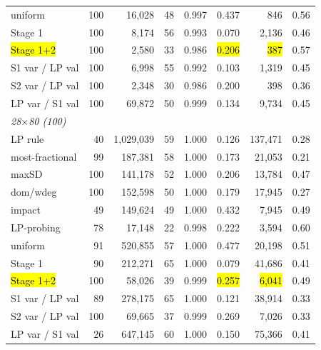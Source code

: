 \begin{table}[t]
\begin{tabular}{lrrrrrrr}
uniform & 100 & 16,028 & 48 & 0.997 & 0.437 & 846 & 0.56 \\
Stage 1 & 100 & 8,174 & 56 & 0.993 & 0.070 & 2,136 & 0.46 \\
\hl{Stage 1+2} & 100 & 2,580 & 33 & 0.986 & \hl{0.206} & \hl{387} & 0.57 \\
S1 var / LP val & 100 & 6,998 & 55 & 0.992 & 0.103 & 1,319 & 0.45 \\
S2 var / LP val & 100 & 2,348 & 30 & 0.986 & 0.200 & 398 & 0.36 \\
LP var / S1 val & 100 & 69,872 & 50 & 0.999 & 0.134 & 9,734 & 0.45 \\
\midrule
\multicolumn{8}{l}{\emph{28$\times$80 (100)}} \\
LP rule & 40 & 1,029,039 & 59 & 1.000 & 0.126 & 137,471 & 0.28 \\
most-fractional & 99 & 187,381 & 58 & 1.000 & 0.173 & 21,053 & 0.21 \\
maxSD & 100 & 141,178 & 52 & 1.000 & 0.206 & 13,784 & 0.47 \\
dom/wdeg & 100 & 152,598 & 50 & 1.000 & 0.179 & 17,945 & 0.27 \\
impact & 49 & 149,624 & 49 & 1.000 & 0.432 & 7,945 & 0.49 \\
LP-probing & 78 & 17,148 & 22 & 0.998 & 0.222 & 3,594 & 0.60 \\
uniform & 91 & 520,855 & 57 & 1.000 & 0.477 & 20,198 & 0.51 \\
Stage 1 & 90 & 212,271 & 65 & 1.000 & 0.079 & 41,686 & 0.41 \\
\hl{Stage 1+2} & 100 & 58,026 & 39 & 0.999 & \hl{0.257} & \hl{6,041} & 0.49 \\
S1 var / LP val & 89 & 278,175 & 65 & 1.000 & 0.121 & 38,914 & 0.33 \\
S2 var / LP val & 100 & 69,665 & 37 & 0.999 & 0.269 & 7,026 & 0.33 \\
LP var / S1 val & 26 & 647,145 & 60 & 1.000 & 0.150 & 75,366 & 0.41 \\
\bottomrule
\end{tabular}
\end{table}